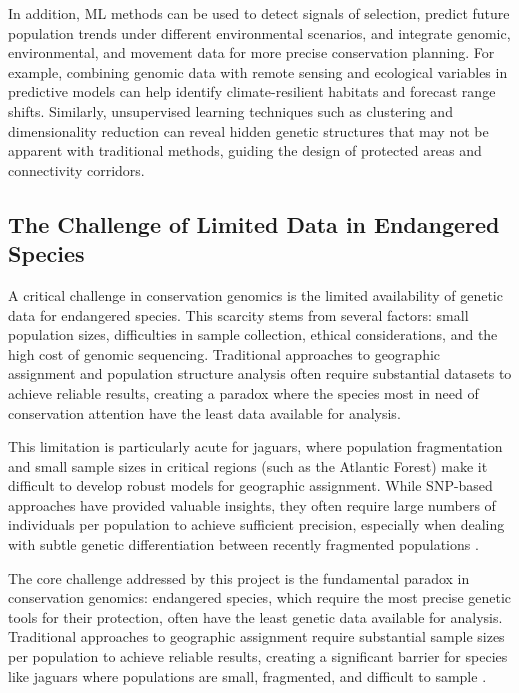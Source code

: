 \documentclass[twocolumn,10pt]{article}
\begin{document}
In addition, ML methods can be used to detect signals of selection, predict future population trends
under different environmental scenarios, and integrate genomic, environmental, and movement data for
more precise conservation planning. For example, combining genomic data with remote sensing and
ecological variables in predictive models can help identify climate-resilient habitats and forecast
range shifts. Similarly, unsupervised learning techniques such as clustering and dimensionality
reduction can reveal hidden genetic structures that may not be apparent with traditional methods,
guiding the design of protected areas and connectivity corridors.

\subsection*{The Challenge of Limited Data in Endangered Species}

A critical challenge in conservation genomics is the limited availability of genetic data for
endangered species. This scarcity stems from several factors: small population sizes, difficulties
in sample collection, ethical considerations, and the high cost of genomic sequencing. Traditional
approaches to geographic assignment and population structure analysis often require substantial
datasets to achieve reliable results, creating a paradox where the species most in need of
conservation attention have the least data available for analysis.

This limitation is particularly acute for jaguars, where population fragmentation and small sample
sizes in critical regions (such as the Atlantic Forest) make it difficult to develop robust models
for geographic assignment. While SNP-based approaches have provided valuable insights, they often
require large numbers of individuals per population to achieve sufficient precision, especially when
dealing with subtle genetic differentiation between recently fragmented populations
\citep{lazzari2025development, haag2010effect}.

The core challenge addressed by this project is the fundamental paradox in conservation genomics:
endangered species, which require the most precise genetic tools for their protection, often have
the least genetic data available for analysis. Traditional approaches to geographic assignment
require substantial sample sizes per population to achieve reliable results, creating a significant
barrier for species like jaguars where populations are small, fragmented, and difficult to sample
\citep{shafer2015genomics}.
\end{document}
